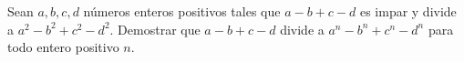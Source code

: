 Sean $a,b,c,d$ números enteros positivos tales que $a-b+c-d$ es impar y divide a $a^2-b^2+c^2-d^2$. Demostrar que $a-b+c-d$ divide a $a^n-b^n+c^n-d^n$ para todo entero positivo $n$.
